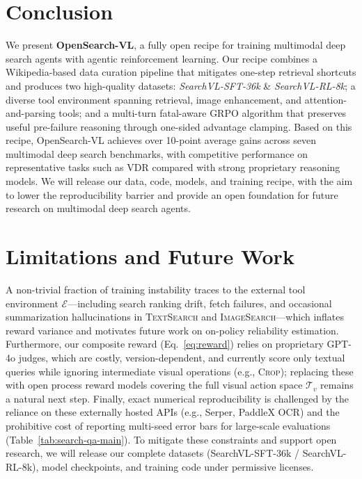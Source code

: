 \vspace{-0.1cm}
\section{Conclusion}
\label{sec:conclusion}
\vspace{-0.1cm}

We present \textbf{OpenSearch-VL}, a fully open recipe for training multimodal deep search agents with agentic reinforcement learning. Our recipe combines a Wikipedia-based data curation pipeline that mitigates one-step retrieval shortcuts and produces two high-quality datasets: \emph{SearchVL-SFT-36k} \& \emph{SearchVL-RL-8k}; a diverse tool environment spanning retrieval, image enhancement, and attention-and-parsing tools; and a multi-turn fatal-aware GRPO algorithm that preserves useful pre-failure reasoning through one-sided advantage clamping. Based on this recipe, OpenSearch-VL achieves over 10-point average gains across seven multimodal deep search benchmarks, with competitive performance on representative tasks such as VDR compared with strong proprietary reasoning models. We will release our data, code, models, and training recipe, with the aim to lower the reproducibility barrier and provide an open foundation for future research on multimodal deep search agents.

\section*{Limitations and Future Work}
\label{apdx:limitations}

A non-trivial fraction of training instability traces to the external tool environment $\mathcal{E}$---including search ranking drift, fetch failures, and occasional summarization hallucinations in \textsc{TextSearch} and \textsc{ImageSearch}---which inflates reward variance and motivates future work on on-policy reliability estimation. Furthermore, our composite reward (Eq.~\ref{eq:reward}) relies on proprietary GPT-4o judges, which are costly, version-dependent, and currently score only textual queries while ignoring intermediate visual operations (e.g., \textsc{Crop}); replacing these with open process reward models covering the full visual action space $\mathcal{T}_v$ remains a natural next step. Finally, exact numerical reproducibility is challenged by the reliance on these externally hosted APIs (e.g., Serper, PaddleX \textsc{OCR}) and the prohibitive cost of reporting multi-seed error bars for large-scale evaluations (Table~\ref{tab:search-qa-main}). To mitigate these constraints and support open research, we will release our complete datasets (SearchVL-SFT-36k / SearchVL-RL-8k), model checkpoints, and training code under permissive licenses.

